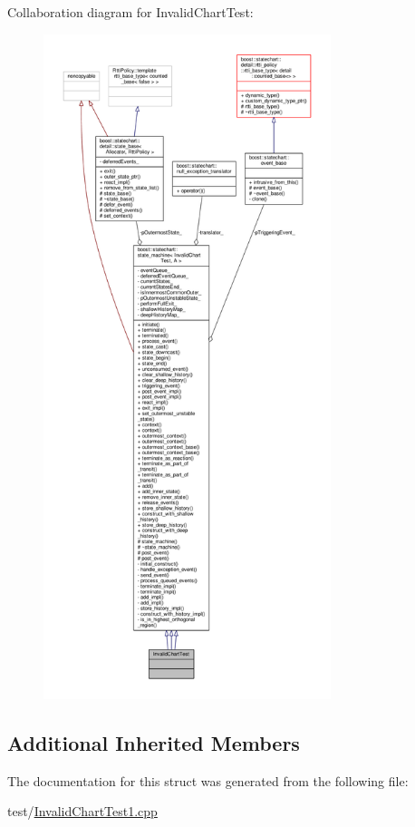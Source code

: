 Collaboration diagram for Invalid\+Chart\+Test\+:
\nopagebreak
\begin{figure}[H]
\begin{center}
\leavevmode
\includegraphics[height=550pt]{struct_invalid_chart_test__coll__graph}
\end{center}
\end{figure}
\subsection*{Additional Inherited Members}


The documentation for this struct was generated from the following file\+:\begin{DoxyCompactItemize}
\item 
test/\mbox{\hyperlink{_invalid_chart_test1_8cpp}{Invalid\+Chart\+Test1.\+cpp}}\end{DoxyCompactItemize}
